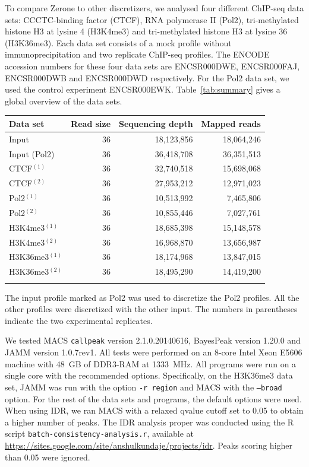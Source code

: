 \documentclass{bioinfo}
\begin{document}
\begin{methods}
To compare Zerone to other discretizers, we analysed four different
ChIP-seq data sets: CCCTC-binding factor (CTCF), RNA polymerase II
(Pol2), tri-methylated histone H3 at lysine 4 (H3K4me3)
and tri-methylated histone H3 at lysine 36 (H3K36me3).
Each data set consists of a mock profile without immunoprecipitation
and two replicate ChIP-seq profiles.
The ENCODE accession numbers for these four data sets are
ENCSR000DWE, ENCSR000FAJ, ENCSR000DWB and ENCSR000DWD respectively.
For the Pol2 data set, we used the control experiment ENCSR000EWK.
Table~\ref{tab:summary} gives a global overview of the data sets.

\begin{table}[!tbp]
{\begin{tabular}{lrrr}
        \toprule
        \textbf{Data set} & \textbf{Read size} &
        \textbf{Sequencing depth} & \textbf{Mapped reads} \\
        \midrule
        Input            & 36 & 18,123,856 & 18,064,246 \\
        Input (Pol2)     & 36 & 36,418,708 & 36,351,513 \\
        CTCF$^{(1)}$     & 36 & 32,740,518 & 15,698,068 \\
        CTCF$^{(2)}$     & 36 & 27,953,212 & 12,971,023 \\
        Pol2$^{(1)}$     & 36 & 10,513,992 &  7,465,806 \\
        Pol2$^{(2)}$     & 36 & 10,855,446 &  7,027,761 \\
        H3K4me3$^{(1)}$  & 36 & 18,685,398 & 15,148,578 \\
        H3K4me3$^{(2)}$  & 36 & 16,968,870 & 13,656,987 \\
        H3K36me3$^{(1)}$ & 36 & 18,174,968 & 13,847,015 \\
        H3K36me3$^{(2)}$ & 36 & 18,495,290 & 14,419,200 \\
        \botrule
\end{tabular}}{The input profile marked as Pol2 was used to discretize the
Pol2 profiles. All the other profiles were discretized with the other input.
The numbers in parentheses indicate the two experimental replicates.}
\end{table}

We tested MACS \texttt{callpeak} version 2.1.0.20140616, BayesPeak
version 1.20.0 and JAMM version 1.0.7rev1. All tests were performed on
an 8-core Intel Xeon E5606 machine with 48~GB of DDR3-RAM at 1333~MHz.
All programs were run on a single core with the recommended options.
Specifically, on the H3K36me3 data set, JAMM was run with the option
\texttt{-r region} and MACS with the \texttt{--broad} option. For the rest of
the data sets and programs, the default options were used.
When using IDR, we ran MACS with a relaxed qvalue cutoff set to 0.05
to obtain a higher number of peaks. The IDR analysis proper was conducted
using the R script \texttt{batch-consistency-analysis.r}, available at
\href{https://sites.google.com/site/anshulkundaje/projects/idr}{https://sites.google.com/site/anshulkundaje/projects/idr}.
Peaks scoring higher than 0.05 were ignored.


\end{methods}
\end{document}
